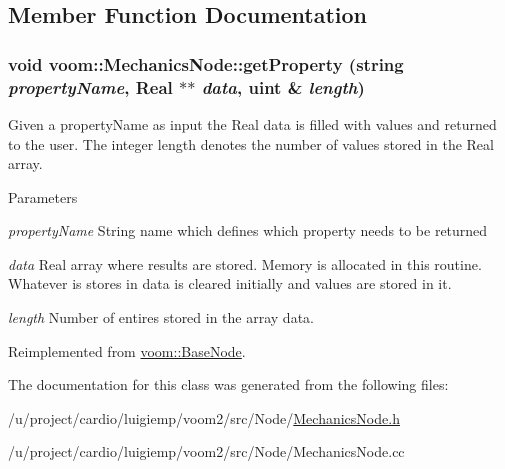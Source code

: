 \subsection{Member Function Documentation}
\hypertarget{classvoom_1_1_mechanics_node_a921fd1f238a85727c87f1f2833d222ab}{
\subsubsection[{getProperty}]{\setlength{\rightskip}{0pt plus 5cm}void voom::MechanicsNode::getProperty (string {\em propertyName}, \/  Real $\ast$$\ast$ {\em data}, \/  uint \& {\em length})}}
\label{classvoom_1_1_mechanics_node_a921fd1f238a85727c87f1f2833d222ab}
Given a propertyName as input the Real data is filled with values and returned to the user. The integer length denotes the number of values stored in the Real array. 
\begin{DoxyParams}{Parameters}
\item[{\em propertyName}]String name which defines which property needs to be returned \item[{\em data}]Real array where results are stored. Memory is allocated in this routine. Whatever is stores in data is cleared initially and values are stored in it. \item[{\em length}]Number of entires stored in the array data. \end{DoxyParams}


Reimplemented from \hyperlink{classvoom_1_1_base_node_a4d42efec19c4e3f4770828688daa65c5}{voom::BaseNode}.

The documentation for this class was generated from the following files:\begin{DoxyCompactItemize}
\item 
/u/project/cardio/luigiemp/voom2/src/Node/\hyperlink{_mechanics_node_8h}{MechanicsNode.h}\item 
/u/project/cardio/luigiemp/voom2/src/Node/MechanicsNode.cc\end{DoxyCompactItemize}
